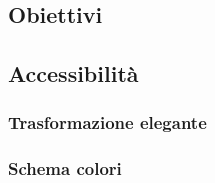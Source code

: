 \documentclass[a4paper]{article}
\begin{document}
		\subsection{Obiettivi}
			
				
		\subsection{Accessibilità}
		 	
		 	\subsubsection{Trasformazione elegante}
		 		

		\newpage
		 	\subsubsection{Schema colori}
		 		

\end{document}
